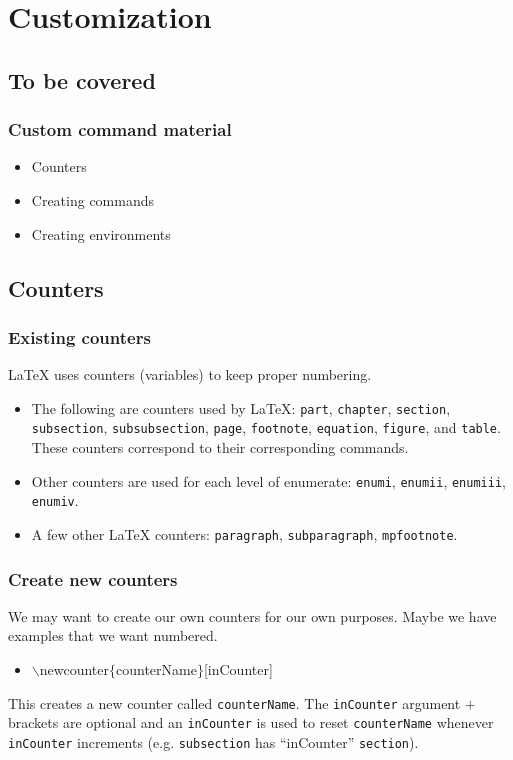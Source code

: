 \section[Customization]{Customization}

\subsection[To be covered]{To be covered}

\begin{frame}  \frametitle{Custom command material}
\begin{itemize}
\item Counters
\item Creating commands
\item Creating environments
\end{itemize}
\end{frame}

\subsection[Counters]{Counters}

\begin{frame}  \frametitle{Existing counters}
LaTeX uses counters (variables) to keep proper numbering. 
\begin{itemize}
\item The following are counters used by LaTeX: \texttt{\color{highlight}part}, \texttt{\color{highlight}chapter}, \texttt{\color{highlight}section}, \texttt{\color{highlight}subsection}, \texttt{\color{highlight}subsubsection}, \texttt{\color{highlight}page}, \texttt{\color{highlight}footnote}, \texttt{\color{highlight}equation}, \texttt{\color{highlight}figure}, and \texttt{\color{highlight}table}. These counters correspond to their corresponding commands.
\item Other counters are used for each level of enumerate: \texttt{\color{highlight}enumi}, \texttt{\color{highlight}enumii}, \texttt{\color{highlight}enumiii}, \texttt{\color{highlight}enumiv}.
\item A few other LaTeX counters: \texttt{\color{highlight}paragraph}, \texttt{\color{highlight}subparagraph}, \texttt{\color{highlight}mpfootnote}.
\end{itemize}
\end{frame}

\begin{frame}  \frametitle{Create new counters}
We may want to create our own counters for our own purposes. Maybe we have examples that we want numbered.
\begin{itemize}
\item[] {\color{command}$\backslash$newcounter\color{braces}$\{${\color{black}counterName}$\}$\color{black}[inCounter]}
\end{itemize}
This creates a new counter called \texttt{counterName}. The \texttt{inCounter} argument $+$ brackets are optional and an \texttt{inCounter} is used to reset \texttt{counterName} whenever \texttt{inCounter} increments (e.g. \texttt{subsection} has ``inCounter'' \texttt{section}).
\end{frame}

